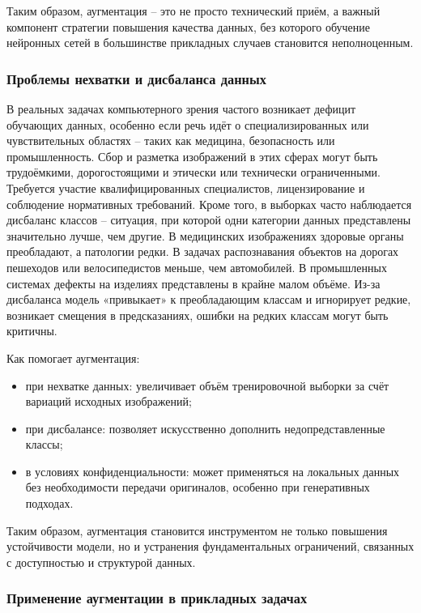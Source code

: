 Таким образом, аугментация – это не просто технический приём, а важный компонент стратегии повышения качества данных, без которого обучение нейронных сетей в большинстве прикладных случаев становится неполноценным.

\subsubsection{Проблемы нехватки и дисбаланса данных}

В реальных задачах компьютерного зрения частого возникает дефицит обучающих данных, особенно если речь идёт о специализированных или чувствительных областях – таких как медицина, безопасность или промышленность. Сбор и разметка изображений в этих сферах могут быть трудоёмкими, дорогостоящими и этически или технически ограниченными. Требуется участие квалифицированных специалистов, лицензирование и соблюдение нормативных требований. Кроме того, в выборках часто наблюдается дисбаланс классов – ситуация, при которой одни категории данных представлены значительно лучше, чем другие. В медицинских изображениях здоровые органы преобладают, а патологии редки. В задачах распознавания объектов на дорогах пешеходов или велосипедистов меньше, чем автомобилей. В промышленных системах дефекты на изделиях представлены в крайне малом объёме. Из-за дисбаланса модель «привыкает» к преобладающим классам и игнорирует редкие, возникает смещения в предсказаниях, ошибки на редких классам могут быть критичны.

Как помогает аугментация:

\begin{itemize}
	\item при нехватке данных: увеличивает объём тренировочной выборки за счёт вариаций исходных изображений;
	\item при дисбалансе: позволяет искусственно дополнить недопредставленные классы;
	\item в условиях конфиденциальности: может применяться на локальных данных без необходимости передачи оригиналов, особенно при генеративных подходах.
\end{itemize}

Таким образом, аугментация становится инструментом не только повышения устойчивости модели, но и устранения фундаментальных ограничений, связанных с доступностью и структурой данных.

\subsubsection{Применение аугментации в прикладных задачах}

